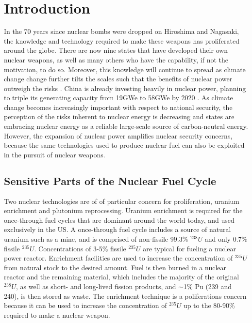 \section{Introduction}
\label{s_motive}

In the 70 years since nuclear bombs were dropped on Hiroshima and Nagasaki, the knowledge and technology required to make these weapons has proliferated around the globe. There are now nine states that have developed their own nuclear weapons, as well as many others who have the capability, if not the motivation, to do so\cite{feiveson_unmaking_2014}.  
Moreover, this knowledge will continue to spread as climate change change further tilts the scales such that the benefits of nuclear power outweigh the risks \cite{mooney_why_2014}.
China is already investing heavily in nuclear power, planning to triple its generating capacity from 19GWe to 58GWe by 2020  \cite{_china_2014}.  As climate change becomes increasingly important with respect to national security, the perception of the risks inherent to nuclear energy is decreasing and states are embracing nuclear energy as a reliable large-scale source of carbon-neutral energy.  However, the expansion of nuclear power amplifies nuclear security concerns, because the same technologies used to produce nuclear fuel can also be exploited in the pursuit of nuclear weapons.


\subsection{Sensitive Parts of the Nuclear Fuel Cycle}

Two nuclear technologies are of of particular concern for proliferation, uranium enrichment and plutonium reprocessing.  Uranium enrichment is required for the once-through fuel cycles that are dominant around the world today, and used exclusively in the \gls{US}.  A once-through fuel cycle includes a source of natural uranium such as a mine, and is comprised of non-fissile 99.3\% $^{238}U$ and only 0.7\% fissile $^{235}U$. Concentrations of 3-5\% fissile $^{235}U$ are typical for fueling a nuclear power reactor.  
Enrichment facilities are used to increase the concentration of $^{235}U$ from natural stock to the desired amount.  Fuel is then burned in a nuclear reactor and the remaining material, which includes the majority of the original $^{238}U$, as well as short- and long-lived fission products, and $\sim$1\% Pu (239 and 240), is then stored as waste.  The enrichment technique is a poliferations concern because it can be used to increase the concentration of $^{235}U$ up to the 80-90\% required to make a nuclear weapon\cite{_military_2014}.

